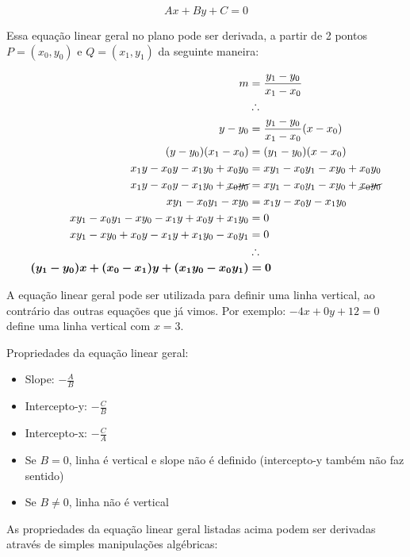 \documentclass[pdftex, brazil, 12pt, twoside]{article}
\begin{document}
\begin{equation}
  Ax + By + C = 0
\end{equation}

Essa equação linear geral no plano pode ser derivada,
a partir de 2 pontos $P=(x_0, y_0)$ e $Q=(x_1, y_1)$ da seguinte maneira:

\begin{equation}
  \begin{split}
    m & = \frac{y_1 - y_0}{x_1 - x_0}\\
      & \therefore\\
    y - y_0 & = \frac{y_1 - y_0}{x_1 - x_0}(x - x_0)\\
    (y - y_0)(x_1 - x_0) & = (y_1 - y_0)(x - x_0)\\
    x_1y - x_0y - x_1y_0 + x_0y_0 & = xy_1 - x_0y_1 - xy_0 + x_0y_0\\
    x_1y - x_0y - x_1y_0 + \cancel{x_0y_0} & = xy_1 - x_0y_1 - xy_0 + \cancel{x_0y_0}\\
    xy_1 - x_0y_1 - xy_0 & = x_1y - x_0y - x_1y_0\\
    xy_1 - x_0y_1 - xy_0 - x_1y + x_0y + x_1y_0 & = 0\\
    xy_1 - xy_0 + x_0y - x_1y + x_1y_0 - x_0y_1 & = 0\\
    & \therefore\\
    \bm{(y_1 - y_0)x + (x_0 - x_1)y + (x_1y_0 - x_0y_1)} &\bm{= 0}
  \end{split}
\end{equation}

A equação linear geral pode ser utilizada para definir uma linha vertical, ao contrário
das outras equações que já vimos. Por exemplo: $-4x + 0y + 12 = 0$ define uma linha vertical
com $x = 3$.

Propriedades da equação linear geral:

\begin{itemize}
\item Slope: $-\frac{A}{B}$
\item Intercepto-y: $-\frac{C}{B}$
\item Intercepto-x: $-\frac{C}{A}$
\item Se $B = 0$, linha é vertical e slope não é definido (intercepto-y também não faz sentido)
\item Se $B \neq 0$, linha não é vertical
\end{itemize}

As propriedades da equação linear geral listadas acima podem ser derivadas através de
simples manipulações algébricas:
\end{document}
